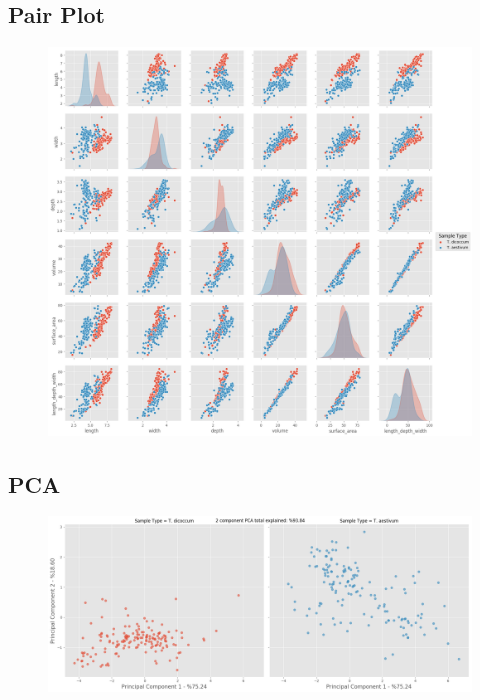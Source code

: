 \documentclass[11pt]{report}
\begin{document}
\subsection{Pair Plot}
\label{sec:org16bd8fc}

\begin{figure}[htbp]
\centering
\includegraphics[width=18cm]{./images/results/group6/pairplot.png}
\label{fig:org5def482}
\end{figure}

\clearpage
\subsection{PCA}
\label{sec:orgb711a83}
\begin{figure}[htbp]
\centering
\includegraphics[width=18cm]{./images/results/group6/pca.png}
\label{fig:orgff19a99}
\end{figure}
\clearpage
\end{document}
